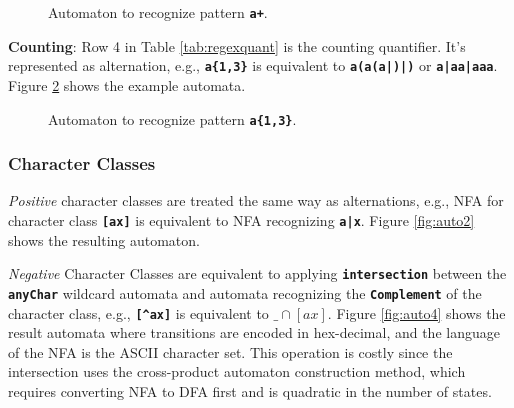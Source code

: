 \begin{figure}[htpb]
\centering
{}
\caption{Automaton to recognize pattern \texttt{\textbf{a+}}.}\label{fig:autoq2}
\end{figure}

\newpage
\textbf{Counting}: Row 4 in Table \ref{tab:regexquant} is the counting quantifier. It's represented as alternation, e.g., \texttt{\textbf{a\{1,3\}}} is equivalent to \texttt{\textbf{a(a(a|\epsilon)|\epsilon)}} or \texttt{\textbf{a|aa|aaa}}. Figure \ref{fig:autoq4} shows the example automata.

\begin{figure}[H]
\centering
{}
\caption{Automaton to recognize pattern \texttt{\textbf{a\{1,3\}}}.}\label{fig:autoq4}
\end{figure}
\subsubsection{Character Classes}
\textit{Positive} character classes are treated the same way as alternations, e.g., NFA for character class \texttt{\textbf{[ax]}} is equivalent to NFA recognizing \texttt{\textbf{a|x}}. Figure \ref{fig:auto2} shows the resulting automaton.

\textit{Negative} Character Classes are equivalent to applying \texttt{\textbf{intersection}} between the \texttt{\textbf{anyChar}} wildcard automata and automata recognizing the \texttt{\textbf{Complement}} of the character class, e.g., \texttt{\textbf{[\textasciicircum ax]}} is equivalent to \texttt{\textbf{$\_ \cap [ax]$}}. Figure \ref{fig:auto4} shows the result automata where transitions are encoded in hex-decimal, and the language of the NFA is the ASCII character set. This operation is costly since the intersection uses the cross-product automaton construction method, which requires converting NFA to DFA first and is quadratic in the number of states.

